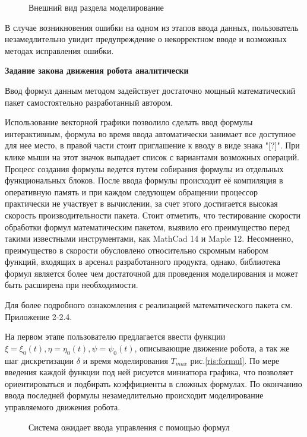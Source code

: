 \begin{figure}[h]
\caption{Внешний вид раздела моделирование}
\label{ris:modeling}
\end{figure}

В случае возникновения ошибки на одном из этапов ввода данных, пользователь незамедлительно увидит предупреждение о некорректном вводе и возможных методах исправления ошибки.
\par
\textbf{Задание закона движения робота аналитически}

Ввод формул данным методом задействует достаточно мощный математический пакет самостоятельно разработанный автором. 

Использование векторной графики позволило сделать ввод формулы интерактивным, формула во время ввода автоматически занимает все доступное для нее место, в правой части стоит приглашение к вводу в виде знака "[?]". При клике мыши на этот значок выпадает список с вариантами возможных операций. Процесс создания формулы ведется путем собирания формулы из отдельных функциональных блоков. После ввода формулы происходит её компиляция в оперативную память и при каждом следующем обращении процессор практически не участвует в вычислении, за счет этого достигается высокая скорость производительности пакета. 
Стоит отметить, что тестирование скорости обработки формул математическим пакетом, выявило его преимущество перед такими известными инструментами, как MathCad 14 и Maple 12. Несомненно, преимущество в скорости обусловлено относительно скромным набором функций, входящих в арсенал разработанного продукта, однако, библиотека формул является более чем достаточной для проведения моделирования и может быть расширена при необходимости.

Для более подробного ознакомления с реализацией математического пакета см. Приложение 2-2.4.

На первом этапе пользователю предлагается ввести функции   $\xi = \xi_0(t), \eta = \eta_0(t), \psi = \psi_0(t)$, описывающие движение робота, а так же шаг дискретизации $\delta$  и время моделирования  $T_{max}$ рис.\eqref{ris:formul}. По мере введения каждой функции под ней рисуется миниатюра графика, что позволяет ориентироваться и подбирать коэффициенты в сложных формулах. По окончанию ввода последней формулы незамедлительно происходит моделирование управляемого движения робота.

\begin{figure}[h]
\caption{Система ожидает ввода управления с помощью формул}
\label{ris:formul}
\end{figure}

